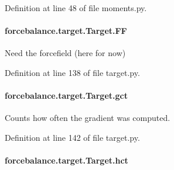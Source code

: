Definition at line 48 of file moments.\-py.

\hypertarget{classforcebalance_1_1target_1_1Target_a38a37919783141ea37fdcf8b00ce0aaf}{
\paragraph[{F\-F}]{\setlength{\rightskip}{0pt plus 5cm}forcebalance.\-target.\-Target.\-F\-F\hspace{0.3cm}{\ttfamily [inherited]}}}\label{classforcebalance_1_1target_1_1Target_a38a37919783141ea37fdcf8b00ce0aaf}


Need the forcefield (here for now) 



Definition at line 138 of file target.\-py.

\hypertarget{classforcebalance_1_1target_1_1Target_aa625ac88c6744eb14ef281d9496d0dbb}{
\paragraph[{gct}]{\setlength{\rightskip}{0pt plus 5cm}forcebalance.\-target.\-Target.\-gct\hspace{0.3cm}{\ttfamily [inherited]}}}\label{classforcebalance_1_1target_1_1Target_aa625ac88c6744eb14ef281d9496d0dbb}


Counts how often the gradient was computed. 



Definition at line 142 of file target.\-py.

\hypertarget{classforcebalance_1_1target_1_1Target_a5b5a42f78052b47f29ed4b940c6111a1}{
\paragraph[{hct}]{\setlength{\rightskip}{0pt plus 5cm}forcebalance.\-target.\-Target.\-hct\hspace{0.3cm}{\ttfamily [inherited]}}}\label{classforcebalance_1_1target_1_1Target_a5b5a42f78052b47f29ed4b940c6111a1}


